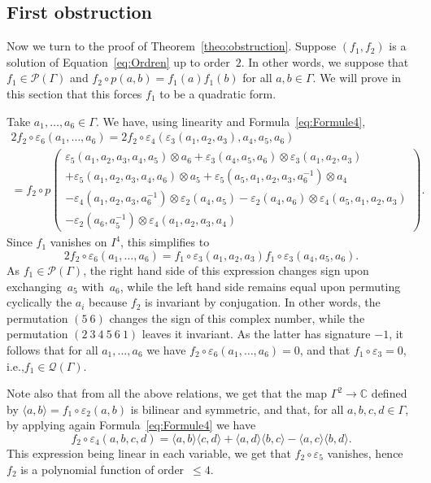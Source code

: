 \documentclass[11pt]{article}
\newcommand{\ie}{i.e.,\xspace}
\let\mathcal\mathscr
\theoremstyle{definition}
\newcommand{\CC}{\mathbb{C}}
\begin{document}
\subsection{First obstruction}
Now we turn to the proof of Theorem~\ref{theo:obstruction}. Suppose
$(f_1,f_2)$ is a solution of Equation~\eqref{eq:Ordren} up to order~$2$.
In other words, we suppose that $f_1\in\mathcal{P}(\Gamma)$ and
$f_2\circ p(a,b)=f_1(a)f_1(b)$ for all $a,b\in\Gamma$. We will prove in
this section that this forces $f_1$ to be a quadratic form.

Take $a_1,\ldots,a_6\in\Gamma$. We have, using linearity and
Formula~\eqref{eq:Formule4},
\begin{multline*}
2f_2\circ\varepsilon_6(a_1, \ldots,a_6) =
2f_2\circ\varepsilon_4(\varepsilon_3(a_1,a_2,a_3), a_4,a_5,a_6) \\
= f_2\circ p\left(\begin{array}{c}
\varepsilon_5(a_1,a_2,a_3,a_4,a_5)\otimes a_6+\varepsilon_3(a_4,a_5,a_6)
\otimes\varepsilon_3(a_1,a_2,a_3) \\
+\varepsilon_5(a_1,a_2,a_3,a_4,a_6)\otimes a_5+
\varepsilon_5(a_5,a_1,a_2,a_3,a_6^{-1})\otimes a_4 \\
-\varepsilon_4(a_1,a_2,a_3,a_6^{-1})\otimes\varepsilon_2(a_4,a_5)
-\varepsilon_2(a_4,a_6)\otimes\varepsilon_4(a_5,a_1,a_2,a_3) \\
-\varepsilon_2(a_6,a_5^{-1})\otimes\varepsilon_4(a_1,a_2,a_3,a_4)
\end{array}\right).
\end{multline*}
Since $f_1$ vanishes on $I^4$, this simplifies to
\[ 2f_2\circ\varepsilon_6(a_1,\ldots,a_6)=f_1\circ\varepsilon_3(a_1,a_2,a_3)
f_1\circ\varepsilon_3(a_4,a_5,a_6). \]
As $f_1\in \mathcal{P}(\Gamma)$, the right hand side of this expression
changes sign upon exchanging~$a_5$ with~$a_6$, while the left hand side
remains equal upon permuting cyclically the $a_i$ because $f_2$ is invariant
by conjugation. In other words, the permutation $(5~6)$ changes the sign of
this complex number, while the permutation $(2~3~4~5~6~1)$ leaves it
invariant. As the latter has signature $-1$, it follows that for all
$a_1,\ldots,a_6$ we have $f_2\circ\varepsilon_6(a_1,\ldots, a_6)=0$,
and that $f_1\circ\varepsilon_3=0$, \ie $f_1\in\mathcal{Q}(\Gamma)$.

Note also that from all the above relations, we get that the map
$\Gamma^2\to\CC$ defined by $\langle a,b\rangle= f_1\circ\varepsilon_2(a,b)$
is bilinear and symmetric, and that, for all $a,b,c,d\in\Gamma$, by applying
again Formula~\eqref{eq:Formule4} we have
\begin{equation}
\label{eq:carre} f_2\circ\varepsilon_4(a,b,c,d)=
\langle a,b\rangle \langle c,d\rangle+\langle a,d\rangle\langle b,c\rangle
-\langle a,c\rangle\langle b,d\rangle.
\end{equation}
This expression being linear in each variable, we get that
$f_2\circ\varepsilon_5$ vanishes, hence $f_2$ is a polynomial function of
order~$\leq 4$.
\end{document}
